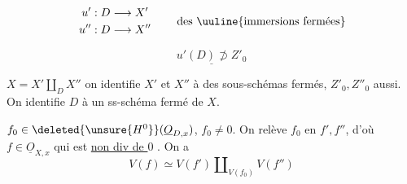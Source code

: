 \[
\left.\begin{aligned}
u' &:D\longrightarrow X'\\
u'' &:D\longrightarrow X''
\end{aligned}\right.\qquad\text{des \uuline{immersions fermées}}
\]

\[
\underline{u'(D)\not\supset Z'_0}
\]

$X=X'\amalg_D X''$ on identifie $X'$ et $X''$ à des sous-schémas fermés,  $Z'_0,Z''_0$ aussi. On identifie $D$ à un  ss-schéma fermé  de $X$.



$f_0\in\deleted{\unsure{H^0}}(\underline O_{D,x})$, $f_0\ne0$. On relève $f_0$ en $f',f''$, d'où $f\in\underline O_{X,x}$  qui est \uline{non div de $0$} . On a
\[
 V(f)\simeq V(f')\amalg_{V(f_0)}V(f'')
\]

